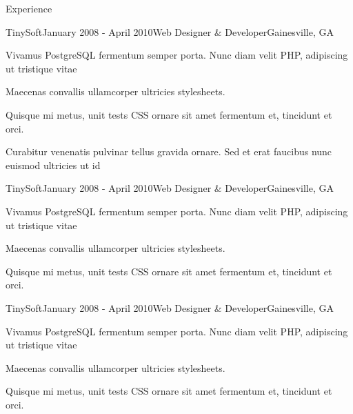 \documentclass[
	11pt, %
]{resume} %
\begin{document}
\begin{rSection}{Experience}

	\begin{rSubsection}{TinySoft}{January 2008 - April 2010}{Web Designer \& Developer}{Gainesville, GA}
		\item Vivamus PostgreSQL fermentum semper porta. Nunc diam velit PHP, adipiscing ut tristique vitae
		\item Maecenas convallis ullamcorper ultricies stylesheets.
		\item Quisque mi metus, unit tests CSS ornare sit amet fermentum et, tincidunt et orci.
		\item Curabitur venenatis pulvinar tellus gravida ornare. Sed et erat faucibus nunc euismod ultricies ut id
	\end{rSubsection}


\begin{rSubsection}{TinySoft}{January 2008 - April 2010}{Web Designer \& Developer}{Gainesville, GA}
	\item Vivamus PostgreSQL fermentum semper porta. Nunc diam velit PHP, adipiscing ut tristique vitae
	\item Maecenas convallis ullamcorper ultricies stylesheets.
	\item Quisque mi metus, unit tests CSS ornare sit amet fermentum et, tincidunt et orci.
\end{rSubsection}


	\begin{rSubsection}{TinySoft}{January 2008 - April 2010}{Web Designer \& Developer}{Gainesville, GA}
		\item Vivamus PostgreSQL fermentum semper porta. Nunc diam velit PHP, adipiscing ut tristique vitae
		\item Maecenas convallis ullamcorper ultricies stylesheets.
		\item Quisque mi metus, unit tests CSS ornare sit amet fermentum et, tincidunt et orci.
	\end{rSubsection}

\end{rSection}

\end{document}

